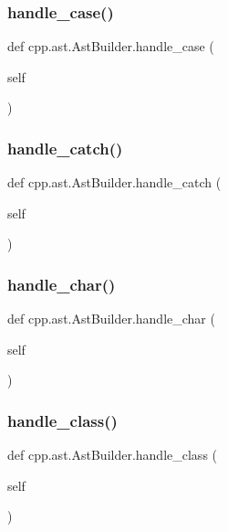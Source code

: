 \subsubsection{\texorpdfstring{handle\_case()}{handle\_case()}}
{\footnotesize\ttfamily def cpp.\+ast.\+Ast\+Builder.\+handle\+\_\+case (\begin{DoxyParamCaption}\item[{}]{self }\end{DoxyParamCaption})}

\mbox{\label{classcpp_1_1ast_1_1_ast_builder_aa38687383d0f54d26416054cf2141837}} 
\subsubsection{\texorpdfstring{handle\_catch()}{handle\_catch()}}
{\footnotesize\ttfamily def cpp.\+ast.\+Ast\+Builder.\+handle\+\_\+catch (\begin{DoxyParamCaption}\item[{}]{self }\end{DoxyParamCaption})}

\mbox{\label{classcpp_1_1ast_1_1_ast_builder_adfbb93646d0d32b39a19f3c70cc031f8}} 
\subsubsection{\texorpdfstring{handle\_char()}{handle\_char()}}
{\footnotesize\ttfamily def cpp.\+ast.\+Ast\+Builder.\+handle\+\_\+char (\begin{DoxyParamCaption}\item[{}]{self }\end{DoxyParamCaption})}

\mbox{\label{classcpp_1_1ast_1_1_ast_builder_a93bd39632593bec36972355b7e1893e0}} 
\subsubsection{\texorpdfstring{handle\_class()}{handle\_class()}}
{\footnotesize\ttfamily def cpp.\+ast.\+Ast\+Builder.\+handle\+\_\+class (\begin{DoxyParamCaption}\item[{}]{self }\end{DoxyParamCaption})}

